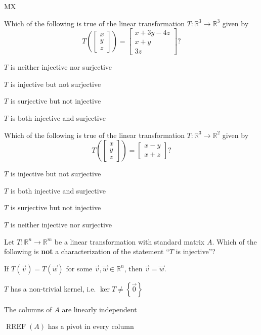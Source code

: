 \documentclass{article}
\newcommand{\IR}{\mathbb{R}}
\newcommand{\RREF}{\operatorname{RREF}}
\begin{document}
\begin{module}{MX}{}
\begin{readinessAssuranceTest}
\item Which of the following is true of the linear transformation $T: \IR^3 \rightarrow \IR^3$ given by $$T\left(\begin{bmatrix} x \\ y \\ z \end{bmatrix} \right) = \begin{bmatrix} x+3y-4z \\ x+y \\ 3z \end{bmatrix}?$$
\begin{readinessAssuranceTestChoices}
\item $T$ is neither injective nor surjective
\item $T$ is injective but not surjective
\item $T$ is surjective but not injective
\item $T$ is both injective and surjective %
\end{readinessAssuranceTestChoices}


\item Which of the following is true of the linear transformation $T:\IR^3 \rightarrow \IR^2$ given by $$T\left(\begin{bmatrix} x \\ y \\ z \end{bmatrix} \right) = \begin{bmatrix} x-y \\ x+z \end{bmatrix} ?$$
\begin{readinessAssuranceTestChoices}
\item $T$ is injective but not surjective
\item $T$ is both injective and surjective
\item $T$ is surjective but not injective %
\item $T$ is neither injective nor surjective
\end{readinessAssuranceTestChoices}


\item Let $T: \IR^n \rightarrow \IR^m$ be a linear transformation with standard matrix $A$.  Which of the following is {\bf not} a characterization of the statement ``$T$ is injective''?
\begin{readinessAssuranceTestChoices}
\item If $T(\vec{v})=T(\vec{w})$ for some $\vec{v}, \vec{w} \in \IR^n$, then $\vec{v}=\vec{w}$.
\item $T$ has a non-trivial kernel, i.e. \(\ker T \neq \left\{ \vec{0}\right\}\) %
\item The columns of $A$ are linearly independent
\item $\RREF(A)$ has a pivot in every column
\end{readinessAssuranceTestChoices}



\end{readinessAssuranceTest}
\end{module}
\end{document}
